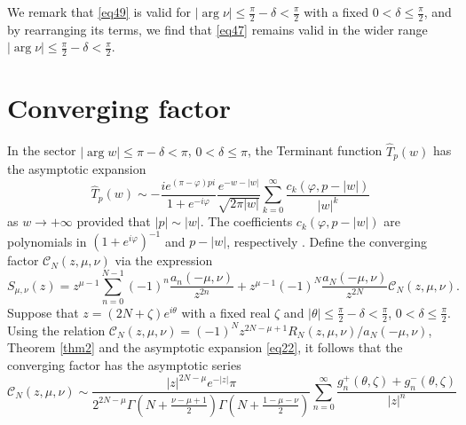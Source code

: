 \documentclass[a4paper,twoside,10pt]{amsart}
\numberwithin{equation}{section}
\begin{document}
We remark that \eqref{eq49} is valid for $\left|\arg \nu \right| \leq \frac{\pi}{2}-\delta<\frac{\pi}{2}$ with a fixed $0<\delta \leq \frac{\pi}{2}$, and by rearranging its terms, we find that \eqref{eq47} remains valid in the wider range $\left|\arg \nu \right| \leq \frac{\pi}{2}-\delta<\frac{\pi}{2}$.

\appendix

\section{Converging factor}\label{appendixa}

In the sector $\left|\arg w\right| \leq \pi -\delta < \pi$, $0 < \delta \leq \pi$, the Terminant function $\widehat T_p \left( w \right)$ has the asymptotic expansion
\begin{equation}\label{eq22}
\widehat T_p \left( w \right) \sim  - \frac{{ie^{\left( {\pi  -\varphi } \right)pi} }}{{1 + e^{ - i\varphi } }}\frac{{e^{ - w - \left| w \right|} }}{{\sqrt {2\pi \left| w \right|} }}\sum\limits_{k = 0}^\infty  {\frac{{c_k \left( {\varphi ,p - \left| w \right|} \right)}}{{\left| w \right|^k }}} 
\end{equation}
as $w\to +\infty$ provided that $\left|p\right| \sim \left|w\right|$. The coefficients $c_k \left( {\varphi ,p - \left| w \right|} \right)$ are polynomials in $\left(1 + e^{i\varphi }\right)^{-1}$ and $p - \left| w \right|$, respectively \cite[p. 261]{Paris3}. Define the converging factor $\mathscr{C}_N \left( {z,\mu ,\nu } \right)$ via the expression
\[
S_{\mu,\nu}\left(z\right) = z^{\mu  - 1} \sum\limits_{n = 0}^{N - 1} {\left( { - 1} \right)^n \frac{{a_n \left( { - \mu ,\nu } \right)}}{{z^{2n} }}}  + z^{\mu  - 1} \left( { - 1} \right)^N \frac{{a_N \left( { - \mu ,\nu } \right)}}{{z^{2N} }}\mathscr{C}_N \left( {z,\mu ,\nu } \right).
\]
Suppose that $z=\left( {2N + \zeta } \right)e^{i\theta }$ with a fixed real $\zeta$ and $\left|\theta\right|\leq \frac{\pi}{2}-\delta<\frac{\pi}{2}$, $0<\delta \leq \frac{\pi}{2}$. Using the relation $\mathscr{C}_N \left( {z,\mu ,\nu } \right) = \left( { - 1} \right)^N z^{2N - \mu  + 1} R_N \left( {z,\mu ,\nu } \right)/a_N \left( { - \mu ,\nu } \right)$, Theorem \ref{thm2} and the asymptotic expansion \eqref{eq22}, it follows that the converging factor has the asymptotic series
\begin{equation}\label{eq23}
\mathscr{C}_N \left( {z,\mu ,\nu } \right) \sim \frac{{\left| z \right|^{2N - \mu } e^{ - \left| z \right|} \pi }}{{2^{2N - \mu } \Gamma \left( {N + \frac{{\nu  - \mu  + 1}}{2}} \right)\Gamma \left( {N+\frac{{1 - \mu  - \nu }}{2}} \right)}}\sum\limits_{n = 0}^\infty  {\frac{{g_n^ +  \left( {\theta,\zeta} \right) + g_n^ -  \left( {\theta,\zeta} \right)}}{{\left| z \right|^n }}}
\end{equation}
\end{document}

